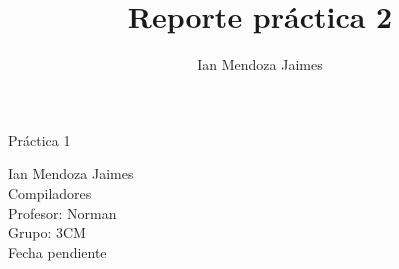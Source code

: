 \documentclass[12pt]{article}
\title{Reporte práctica 2}
\author{Ian Mendoza Jaimes}
\date{}
\begin{document}
\begin{titlepage}
\centering
	\vspace*{1.5in}
	\begin{huge}
		Práctica 1\\
	\end{huge}
	\vspace{4em}
	\begin{Large}
		Ian Mendoza Jaimes \\
		\vspace{4em}
		Compiladores \\
		\vspace{1em}
		Profesor: Norman \\
		\vspace{1em}
		Grupo: 3CM \\
		\vspace{1em}
		Fecha pendiente \\
	\end{Large}
\end{titlepage}

\tableofcontents
{}
\pagebreak



\newpage



\newpage



\newpage



\vspace{3em}



\end{document}
